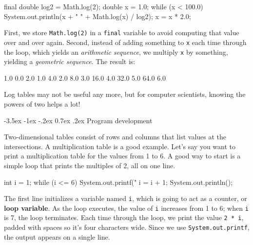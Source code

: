 \documentclass[12pt]{book}
\makeatletter
\theoremstyle{exercise}
\newcommand{\java}[1]{\verb"#1"}
\renewcommand{\section}{\@startsection {section}{1}{\z@}%
    {-3.5ex \@plus -1ex \@minus -.2ex}%
    {0.7ex \@plus.2ex}%
    {\normalfont\Large\bfseries}}
\newcommand{\java}[1]{\lstinline{#1}} %
\makeatother
\begin{document}
\begin{code}
    final double log2 = Math.log(2);
    double x = 1.0;
    while (x < 100.0) {
        System.out.println(x + "   " + Math.log(x) / log2);
        x = x * 2.0;
    }
\end{code}

First, we store \java{Math.log(2)} in a \java{final} variable to avoid computing that value over and over again.
Second, instead of adding something to \java{x} each time through the loop, which yields an {\em arithmetic sequence}, we multiply \java{x} by something, yielding a {\em geometric sequence}.
The result is:

\begin{stdout}
1.0   0.0
2.0   1.0
4.0   2.0
8.0   3.0
16.0   4.0
32.0   5.0
64.0   6.0
\end{stdout}

Log tables may not be useful any more, but for computer scientists, knowing the powers of two helps a lot!


\section{Program development}
\label{encapsulation}


Two-dimensional tables consist of rows and columns that list values at the intersections.
A multiplication table is a good example.
Let's say you want to print a multiplication table for the values from 1 to 6.
A good way to start is a simple loop that prints the multiples of 2, all on one line.

\begin{code}
    int i = 1;
    while (i <= 6) {
        System.out.printf("%
        i = i + 1;
    }
    System.out.println();
\end{code}


The first line initializes a variable named \java{i}, which is going to act as a counter, or {\bf loop variable}.
As the loop executes, the value of \java{i} increases from 1 to 6; when \java{i} is 7, the loop terminates.
Each time through the loop, we print the value \java{2 * i}, padded with spaces so it's four characters wide.
Since we use \java{System.out.printf}, the output appears on a single line.
\end{document}
